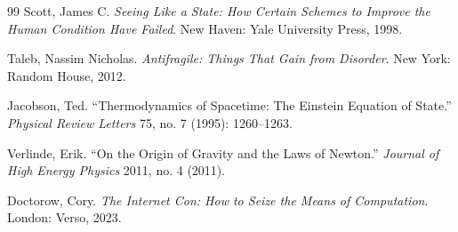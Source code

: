 \documentclass[12pt]{article}
\begin{document}
\begin{thebibliography}{99}
Scott, James C.
\textit{Seeing Like a State: How Certain Schemes to Improve the Human Condition Have Failed}.
New Haven: Yale University Press, 1998.

Taleb, Nassim Nicholas.
\textit{Antifragile: Things That Gain from Disorder}.
New York: Random House, 2012.

Jacobson, Ted.
``Thermodynamics of Spacetime: The Einstein Equation of State.''
\textit{Physical Review Letters} 75, no. 7 (1995): 1260--1263.

Verlinde, Erik.
``On the Origin of Gravity and the Laws of Newton.''
\textit{Journal of High Energy Physics} 2011, no. 4 (2011).

Doctorow, Cory.
\textit{The Internet Con: How to Seize the Means of Computation}.
London: Verso, 2023.

\end{thebibliography}
\end{document}
